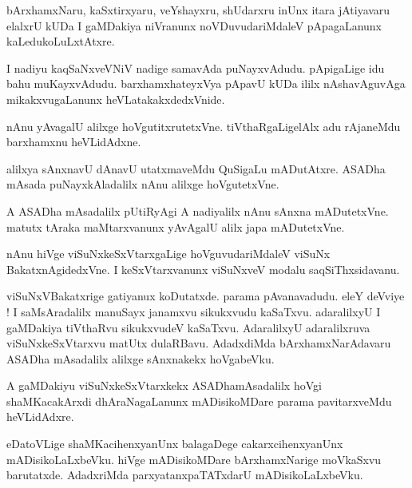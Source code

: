 \documentclass{article}
\begin{document}
\begin{mn}%
bArxhamxNaru, kaSxtirxyaru, veYshayxru, shUdarxru inUnx itara jAtiyavaru elalxrU kUDa I gaMDakiya 
niVranunx noVDuvudariMdaleV pApagaLanunx kaLedukoLuLxtAtxre.
\end{mn}

\begin{mn}%
I nadiyu kaqSaNxveVNiV nadige samavAda puNayxvAdudu. pApigaLige idu bahu muKayxvAdudu. 
barxhamxhateyxVya pApavU kUDa ililx nAshavAguvAga mikakxvugaLanunx heVLatakakxdedxVnide.
\end{mn}

\begin{mn}%
nAnu yAvagalU alilxge hoVgutitxrutetxVne. tiVthaRgaLigelAlx adu rAjaneMdu barxhamxnu heVLidAdxne.
\end{mn}

\begin{mn}%
alilxya sAnxnavU dAnavU utatxmaveMdu QuSigaLu mADutAtxre. ASADha mAsada puNayxkAladalilx nAnu 
alilxge hoVgutetxVne.
\end{mn}

\begin{mn}%
A ASADha mAsadalilx pUtiRyAgi A nadiyalilx nAnu sAnxna mADutetxVne. matutx tAraka maMtarxvanunx 
yAvAgalU alilx japa mADutetxVne.
\end{mn}

\begin{mn}%
nAnu hiVge viSuNxkeSxVtarxgaLige hoVguvudariMdaleV viSuNx BakatxnAgidedxVne. I keSxVtarxvanunx 
viSuNxveV modalu saqSiThxsidavanu.
\end{mn}

\begin{mn}%
viSuNxVBakatxrige gatiyanux koDutatxde. parama pAvanavadudu. eleY deVviye ! I saMsAradalilx 
manuSayx janamxvu sikukxvudu kaSaTxvu. adaralilxyU I gaMDakiya tiVthaRvu sikukxvudeV kaSaTxvu. 
AdaralilxyU adaralilxruva viSuNxkeSxVtarxvu matUtx dulaRBavu. AdadxdiMda bArxhamxNarAdavaru ASADha 
mAsadalilx alilxge sAnxnakekx hoVgabeVku.
\end{mn}

\begin{mn}%
A gaMDakiyu viSuNxkeSxVtarxkekx ASADhamAsadalilx hoVgi shaMKacakArxdi dhAraNagaLanunx mADisikoMDare 
parama pavitarxveMdu heVLidAdxre.
\end{mn}

\begin{mn}%
eDatoVLige shaMKacihenxyanUnx balagaDege cakarxcihenxyanUnx mADisikoLaLxbeVku. hiVge mADisikoMDare 
bArxhamxNarige moVkaSxvu barutatxde. AdadxriMda parxyatanxpaTATxdarU mADisikoLaLxbeVku.
\end{mn}
\end{document}
